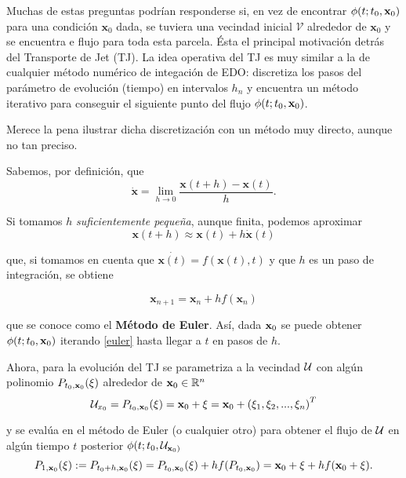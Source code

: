 Muchas de estas preguntas podrían responderse si, en vez de encontrar $\phi(t;t_0,\mathbf{x}_0)$ para una condición $\mathbf{x}_0$ dada, se tuviera una vecindad inicial $\mathcal{V}$ alrededor de $\mathbf{x}_0$ y se encuentra e flujo para toda esta parcela. Ésta el principal motivación detrás del Transporte de Jet (TJ). La idea operativa del TJ es muy similar a la de cualquier método numérico de integación de EDO: discretiza los pasos del parámetro de evolución (tiempo) en intervalos $h_n$ y encuentra un método iterativo para conseguir el siguiente punto del flujo $\phi(t;t_0,\mathbf{x}_0)$.

Merece la pena ilustrar dicha discretización con un método muy directo, aunque no tan preciso.

Sabemos, por definición, que 
\begin{equation*}
\dot{\mathbf{x}} = \lim_{h\to 0} \frac{\mathbf{x}(t+h)-\mathbf{x}(t)}{h}.
\end{equation*}  

Si tomamos $h$ \textit{suficientemente pequeña}, aunque finita, podemos aproximar
\begin{equation*}
\mathbf{x}(t+h) \approx \mathbf{x}(t) + h \dot{\mathbf{x}}(t)
\end{equation*}

que, si tomamos en cuenta que $\dot{\mathbf{x}(t)} = f(\mathbf{x}(t),t)$ y que $h$ es un paso de integración, se obtiene
 
\begin{equation}
\mathbf{x}_{n+1} = \mathbf{x}_n + h f(\mathbf{x}_n)
\label{euler} 
\end{equation}

que se conoce como el \textbf{Método de Euler}. Así, dada $\mathbf{x}_0$ se puede obtener $\phi(t;t_0,\mathbf{x}_0)$ iterando \ref{euler} hasta llegar a $t$ en pasos de $h$.

Ahora, para la evolución del TJ se parametriza a la vecindad $\mathcal{U}$ con algún polinomio $P_{t_0,\mathbf{x}_0}(\xi)$ alrededor de $\mathbf{x}_0 \in \mathbb{R}^n$ 
\begin{equation*}
\mathcal{U}_{x_0} = P_{t_0,\mathbf{x}_0}(\xi) = \mathbf{x}_0 + \xi = \mathbf{x}_0 + \left( \xi_1, \xi_2, ..., \xi_n \right)^T
\end{equation*} 

y se evalúa en el método de Euler (o cualquier otro) para obtener el flujo de $\mathcal{U}$ en algún tiempo $t$ posterior $\phi(t;t_0,\mathcal{U}_{\mathbf{x}_0)}$
\begin{equation*}
P_{1,\mathbf{x}_0}(\xi) := P_{t_0+h,\mathbf{x}_0}(\xi) = P_{t_0,\mathbf{x}_0}(\xi) + h f(P_{t_0,\mathbf{x}_0}) = \mathbf{x}_0 + \xi + h f(\mathbf{x}_0 + \xi).
\end{equation*}

